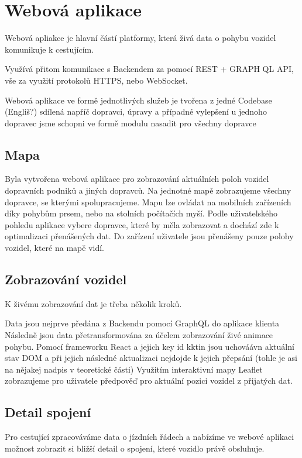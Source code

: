 \section{Webová aplikace}

Webová apliakce je hlavní částí platformy, která živá data o pohybu vozidel komunikuje k cestujícím.

Využívá přitom komunikace s Backendem za pomocí REST + GRAPH QL API, vše za využití protokolů HTTPS, nebo WebSocket.



Webová aplikace ve formě jednotlivých služeb je tvořena z jedné Codebase (Engliš?) sdílená napříč dopravci, úpravy a případné vylepšení u jednoho dopravec jsme schopni ve formě modulu nasadit pro všechny dopravce

\subsection{Mapa}
Byla vytvořena webová aplikace pro zobrazování aktuálních poloh vozidel dopravních podniků a jiných dopravců.
Na jednotné mapě zobrazujeme všechny dopravce, se kterými spolupracujeme.
Mapu lze ovládat na mobilních zařízeních díky pohybům prsem, nebo na stolních počítačích myší. Podle uživatelského pohledu aplikace vybere dopravce, které by měla zobrazovat a dochází zde k optimalizaci přenášených dat. Do zařízení uživatele jsou přenášeny pouze polohy vozidel, které na mapě vidí.

\subsection{Zobrazování vozidel}
K živému zobrazování dat je třeba několik kroků.

Data jsou nejprve předána z Backendu pomocí GraphQL do aplikace klienta
Následně jsou data přetransformována za účelem zobrazování živé animace pohybu.
Pomocí frameworku React a jejich key id kktin jsou uchováávn aktuální stav DOM a při jejich následné aktualizaci nejdojde k jejich přepsání (tohle je asi na nějakej nadpis v teoretické části)
Využitím interaktivní mapy Leaflet zobrazujeme pro uživatele předpověď pro aktuální pozici vozidel z přijatých dat.

\subsection{Detail spojení}
Pro cestující zpracováváme data o jízdních řádech a nabízíme ve webové aplikaci možnost zobrazit si bližší detail o spojení, které vozidlo právě obsluhuje.

